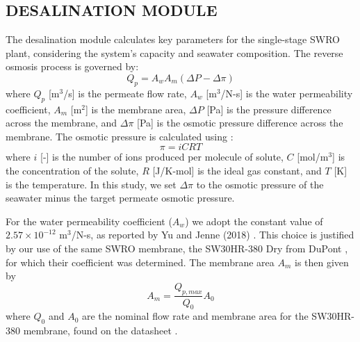 \documentclass[twocolumn,10pt]{asme2e}
\begin{document}
\subsection{DESALINATION MODULE}
The desalination module calculates key parameters for the single-stage SWRO plant, considering the system's capacity and seawater composition. The reverse osmosis process is governed by:
\begin{equation}
    \label{eq:ro}
    Q_p = A_w A_m (\Delta P - \Delta \pi)
\end{equation}
\noindent where $Q_p$ [m$^3$/s] is the permeate flow rate, $A_w$ [m$^3$/N-s] is the water permeability coefficient, $A_m$ [m$^2$] is the membrane area, $\Delta P$ [Pa] is the pressure difference across the membrane, and $\Delta \pi$ [Pa] is the osmotic pressure difference across the membrane. The osmotic pressure is calculated using \cite{separationprocesses}:
\begin{equation}
    \label{eq:osmotic_pressure}
    \pi = iCRT
\end{equation}
\noindent where $i$ [-] is the number of ions produced per molecule of solute, $C$ [mol/m$^3$] is the concentration of the solute, $R$ [J/K-mol] is the ideal gas constant, and $T$ [K] is the temperature. In this study, we set $\Delta \pi$ to the osmotic pressure of the seawater minus the target permeate osmotic pressure.


For the water permeability coefficient ($A_w$) we adopt the constant value of $2.57\times10^{-12}$ m$^3$/N-s, as reported by Yu and Jenne (2018) \cite{Yu2018}. This choice is justified by our use of the same SWRO membrane, the SW30HR-380 Dry from DuPont \cite{SW30HR380}, for which their coefficient was determined. The membrane area $A_m$ is then given by
\begin{equation}
    A_m = \frac{Q_{p,max}}{Q_0}A_0
    \label{eq:membrane_area}
\end{equation}   
\noindent where $Q_0$ and $A_0$ are the nominal flow rate and membrane area for the SW30HR-380 membrane, found on the datasheet \cite{SW30HR380}.
\end{document}
